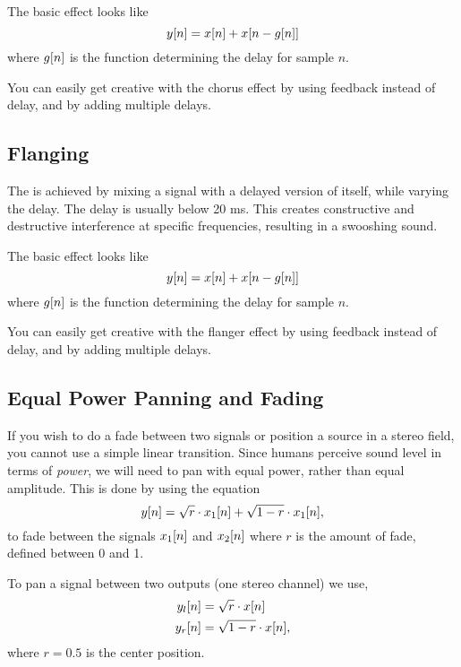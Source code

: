 \documentclass[11pt]{article}
\let\originalleft\left
\let\originalright\right
\renewcommand{\left}{\mathopen{}\mathclose\bgroup\originalleft}
\renewcommand{\right}{\aftergroup\egroup\originalright}
\def\lsqb{\left[}
\def\rsqb{\right]}
\def\sqb#1{\lsqb #1 \rsqb}
\def\ysig{y\sqb{n}}
\begin{document}
The basic effect looks like
\begin{equation}
	\ysig = x\sqb{n} + x\sqb{n - g\sqb{n}}
\end{equation}
where $g\sqb{n}$ is the function determining the delay for sample $n$.

You can easily get creative with the chorus effect by using feedback instead of delay, and by adding multiple delays.

\subsection{Flanging}
The  is achieved by mixing a signal with a delayed version of itself, while varying the delay. The delay is usually below 20 ms. This creates constructive and destructive interference at specific frequencies, resulting in a swooshing sound.

The basic effect looks like
\begin{equation}
	\ysig = x\sqb{n} + x\sqb{n - g\sqb{n}}
\end{equation}
where $g\sqb{n}$ is the function determining the delay for sample $n$.

You can easily get creative with the flanger effect by using feedback instead of delay, and by adding multiple delays.

\subsection{Equal Power Panning and Fading}
If you wish to do a fade between two signals or position a source in a stereo field, you cannot use a simple linear transition. Since humans perceive sound level in terms of \textit{power}, we will need to pan with equal power, rather than equal amplitude. This is done by using the equation
\begin{equation}
	\ysig = \sqrt{r} \cdot x_1\sqb{n} + \sqrt{1 - r} \cdot x_1\sqb{n},
\end{equation}
to fade between the signals $x_1\sqb{n}$ and $x_2\sqb{n}$ where $r$ is the amount of fade, defined between 0 and 1.

To pan a signal between two outputs (one stereo channel) we use,
\begin{align}
	y_l\sqb{n} &= \sqrt{r} \cdot x\sqb{n} \\
	y_r\sqb{n} &= \sqrt{1 - r} \cdot x\sqb{n},
\end{align}
where $r = 0.5$ is the center position.
\end{document}
